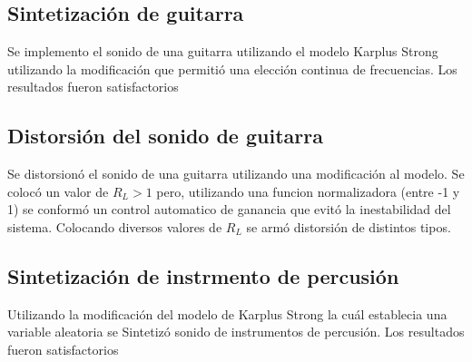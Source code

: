 \documentclass[assd_tp2_main.tex]{subfiles}
\begin{document}
\subsection{Sintetización de guitarra}
Se implemento el sonido de una guitarra utilizando el modelo Karplus Strong utilizando la modificación que permitió una elección continua de frecuencias. Los resultados fueron satisfactorios


\subsection{Distorsión del sonido de guitarra}
Se distorsionó el sonido de una guitarra utilizando una modificación al modelo. Se colocó un valor de $R_L>1$ pero, utilizando una funcion normalizadora (entre -1 y 1) se conformó un control automatico de ganancia que evitó la inestabilidad del sistema. Colocando diversos valores de $R_L$ se armó distorsión de distintos tipos. 
 
 
\subsection{Sintetización de instrmento de percusión}

Utilizando la modificación del modelo de Karplus Strong la cuál establecia una variable aleatoria se Sintetizó sonido de instrumentos de percusión. Los resultados fueron satisfactorios
\end{document}
